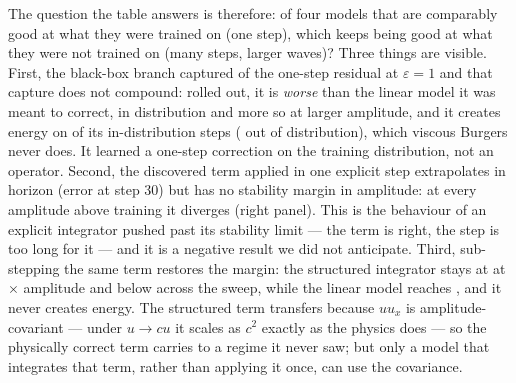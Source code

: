 \documentclass[11pt,a4paper]{article}
\begin{document}
The question the table answers is therefore: of four models that are comparably good at what they were trained on (one step), which keeps being good at what they were not trained on (many steps, larger waves)? Three things are visible. First, the black-box branch captured \wpTwoCapOne{} of the one-step residual at $\varepsilon=1$ and that capture does not compound: rolled out, it is \emph{worse} than the linear model it was meant to correct, in distribution and more so at larger amplitude, and it creates energy on \wpEnergyMlpIdMean{} of its in-distribution steps (\wpEnergyMlpOodMean{} out of distribution), which viscous Burgers never does. It learned a one-step correction on the training distribution, not an operator. Second, the discovered term applied in one explicit step extrapolates in horizon (error \wpRollQuadId{} at step 30) but has no stability margin in amplitude: at every amplitude above training it diverges (right panel). This is the behaviour of an explicit integrator pushed past its stability limit — the term is right, the step is too long for it — and it is a negative result we did not anticipate. Third, sub-stepping the same term restores the margin: the structured integrator stays at \wpRollQuadIntOod{} at \wpAmpOod$\times$ amplitude and below \wpAmpQuadIntMax{} across the sweep, while the linear model reaches \wpAmpLinMax{}, and it never creates energy. The structured term transfers because $u u_x$ is amplitude-covariant — under $u \to c u$ it scales as $c^2$ exactly as the physics does — so the physically correct term carries to a regime it never saw; but only a model that integrates that term, rather than applying it once, can use the covariance.
\end{document}
